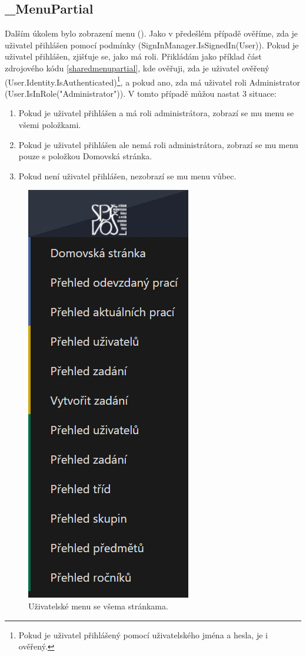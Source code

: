 \documentclass[a4paper, 12pt]{report}
\begin{document}
	\subsection{\_MenuPartial} \label{MenuPartial}
	Dalším úkolem bylo zobrazení menu (). Jako v předešlém případě ověříme, zda je uživatel přihlášen pomocí podmínky (SignInManager.IsSignedIn(User)). Pokud je uživatel přihlášen, zjišťuje se, jako má roli. Přikládám jako příklad část zdrojového kódu \ref{sharedmenupartial}, kde ověřuji, zda je uživatel ověřený (User.Identity.IsAuthenticated)\footnote{Pokud je uživatel přihlášený pomocí uživatelského jména a hesla, je i ověřený.}, a pokud ano, zda má uživatel roli Administrator (User.IsInRole("Administrator")). V tomto případě můžou nastat 3 situace:
	\begin{enumerate}
			\item Pokud je uživatel přihlášen a má roli administrátora, zobrazí se mu menu se všemi položkami.
			\item Pokud je uživatel přihlášen ale nemá roli administrátora, zobrazí se mu menu pouze s položkou Domovská stránka.
			\item Pokud není uživatel přihlášen, nezobrazí se mu menu vůbec.
	\end{enumerate}\par
	\begin{figure}[h!]
		\centering
		\includegraphics[scale=0.7]{Menu}
		\caption{Uživatelské menu se všema stránkama.}
		\label{Menu}
	\end{figure}
\end{document}
